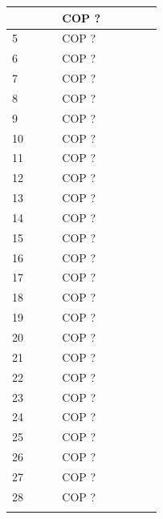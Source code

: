 \begin{center}
\begin{longtable}[H]{|p{0.333\linewidth}|p{0.3333\linewidth}|p{0.3333\linewidth}|}
{\begin{center}
\begin{tabular}{ |p{3.5cm}| p{3cm}|}
    4                       &  COP ?            \\ \hline
    5                       &  COP ?            \\ \hline
    6                       &  COP ?            \\ \hline
    7                       &  COP ?            \\ \hline
    8                       &  COP ?            \\ \hline
    9                       &  COP ?            \\ \hline
    10                      &  COP ?            \\ \hline
    11                      &  COP ?            \\ \hline
    12                      &  COP ?            \\ \hline
    13                      &  COP ?            \\ \hline
    14                      &  COP ?            \\ \hline
    15                      &  COP ?            \\ \hline
    16                      &  COP ?            \\ \hline
    17                      &  COP ?            \\ \hline
    18                      &  COP ?            \\ \hline
    19                      &  COP ?            \\ \hline
    20                      &  COP ?            \\ \hline
    21                      &  COP ?            \\ \hline
    22                      &  COP ?            \\ \hline
    23                      &  COP ?            \\ \hline
    24                      &  COP ?            \\ \hline
    25                      &  COP ?            \\ \hline
    26                      &  COP ?            \\ \hline
    27                      &  COP ?            \\ \hline
    28                      &  COP ?            \\ \hline
   \end{tabular}
  \end{center}
  }                                                                                              \\ \hline

\end{longtable}
\end{center}
